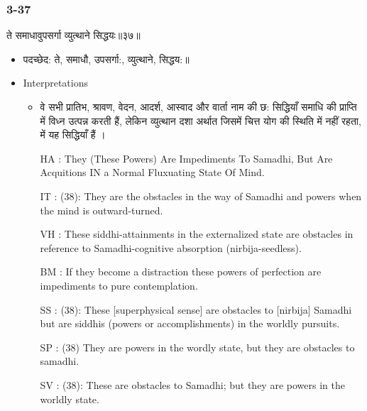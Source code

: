 \begin{frame}[fragile]\frametitle{3-37}
\begin{sanskrit}
ते समाधावुपसर्गा व्युत्थाने सिद्धयः॥३७॥
\end{sanskrit}

	\begin{itemize}
	\item पदच्छेद:  ते, समाधौ, उपसर्गा:, व्युत्थाने, सिद्धय:॥
	\item Interpretations
		\begin{itemize}	
		\item वे सभी प्रातिभ, श्रावण, वेदन, आदर्श, आस्वाद और वार्ता नाम की छ: सिद्धियाँ समाधि की प्राप्ति में विध्न उत्पन्न करती हैं, लेकिन व्युत्थान दशा अर्थात जिसमें चित्त योग की स्थिति में नहीं रहता, में यह सिद्धियाँ हैं ।
		\item [HA]: They (These Powers) Are Impediments To Samadhi, But Are Acquitions IN a Normal Fluxuating State Of Mind.
		\item [IT]: (38): They are the obstacles in the way of Samadhi and powers when the mind is outward-turned.
		\item [VH]: These siddhi-attainments in the externalized state are obstacles in reference to Samadhi-cognitive absorption (nirbija-seedless).
		\item [BM]: If they become a distraction these powers of perfection are impediments to pure contemplation.
		\item [SS]: (38): These [superphysical sense] are obstacles to [nirbija] Samadhi but are siddhis (powers or accomplishments) in the worldly pursuits.
		\item [SP]: (38) They are powers in the wordly state, but they are obstacles to samadhi.
		\item [SV]: (38): These are obstacles to Samadhi; but they are powers in the worldly state. 
		\end{itemize}
	\end{itemize}
\end{frame}


